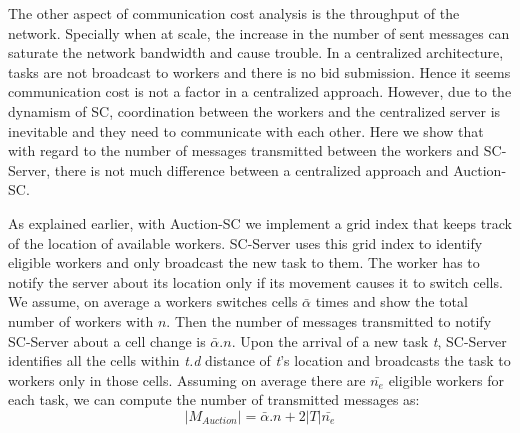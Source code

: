 The other aspect of communication cost analysis is the throughput of the network. Specially when at scale, the increase in the number of sent messages can saturate the network bandwidth and cause trouble. In a centralized architecture, tasks are not broadcast to workers and there is no bid submission. Hence it seems communication cost is not a factor in a centralized approach. However, due to the dynamism of SC, coordination between the workers and the centralized server is inevitable and they need to communicate with each other. Here we show that with regard to the number of messages transmitted between the workers and SC-Server, there is not much difference between a centralized approach and Auction-SC.

As explained earlier, with Auction-SC we implement a grid index that keeps track of the location of available workers. SC-Server uses this grid index to identify eligible workers and only broadcast the new task to them. The worker has to notify the server about its location only if its movement causes it to switch cells. We assume, on average a workers switches cells $\bar{\alpha}$ times and show the total number of workers with $n$. Then the number of messages transmitted to notify SC-Server about a cell change is $\bar{\alpha}.n$. Upon the arrival of a new task \textit{t}, SC-Server identifies all the cells within \textit{t.d} distance of \textit{t}'s location and broadcasts the task to workers only in those cells. Assuming on average there are $\bar{n_e}$ eligible workers for each task, we can compute the number of transmitted messages as:
\begin{equation*}
\left| M_{Auction} \right| = \bar{\alpha}.n + 2|T|\bar{n_e}
\end{equation*}

